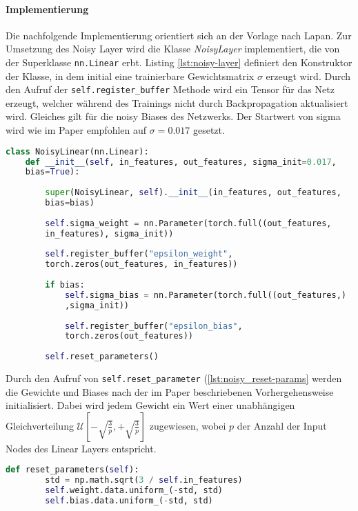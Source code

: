 \documentclass[11pt]{scrartcl}
\begin{document}
\paragraph*{Implementierung}
\noindent
\newline
Die nachfolgende Implementierung orientiert sich an der Vorlage nach Lapan\cite[~S.179]{L2018}.
Zur Umsetzung des Noisy Layer wird die Klasse \textit{NoisyLayer} implementiert, die von der
Superklasse \lstinline!nn.Linear! erbt. Listing \ref{lst:noisy-layer} definiert den Konstruktor
der Klasse, in dem initial eine trainierbare Gewichtsmatrix $\sigma$ erzeugt wird. Durch den
Aufruf der \lstinline!self.register_buffer! Methode wird ein Tensor für das Netz erzeugt, welcher
während des Trainings nicht durch Backpropagation aktualisiert wird. Gleiches gilt für die noisy
Biases des Netzwerks. Der Startwert von sigma wird wie im Paper empfohlen \cite[~S.6]{FAPMOGM2017}
auf $\sigma=0.017$ gesetzt.

\begin{lstlisting}[language=Python, caption=Konstruktor Noisy Layer, label=lst:noisy-layer]
class NoisyLinear(nn.Linear):
	def __init__(self, in_features, out_features, sigma_init=0.017, 
	bias=True):
		
		super(NoisyLinear, self).__init__(in_features, out_features,
		bias=bias)
		
		self.sigma_weight = nn.Parameter(torch.full((out_features,
		in_features), sigma_init))
		
		self.register_buffer("epsilon_weight", 
		torch.zeros(out_features, in_features))
		
		if bias:
    		self.sigma_bias = nn.Parameter(torch.full((out_features,)
    		,sigma_init))
    		
    		self.register_buffer("epsilon_bias", 
    		torch.zeros(out_features))
    		
		self.reset_parameters()
\end{lstlisting}

Durch den Aufruf von \lstinline!self.reset_parameter! (\ref{lst:noisy_reset-params} werden die
Gewichte und Biases nach der im Paper beschriebenen Vorhergehensweise initialisiert. Dabei wird
jedem Gewicht ein Wert einer unabhängigen Gleichverteilung
$\mathcal{U}[-\sqrt{\frac{3}{p}},+\sqrt{\frac{3}{p}}]$ zugewiesen, wobei $p$ der Anzahl der
Input Nodes des Linear Layers entspricht.
 
\begin{lstlisting}[language=Python, caption=Reinitialisierung der Gewichte und Biases, 
label=lst:noisy_reset-params]
	def reset_parameters(self):
		std = np.math.sqrt(3 / self.in_features)
		self.weight.data.uniform_(-std, std)
		self.bias.data.uniform_(-std, std)
\end{lstlisting}
\end{document}
